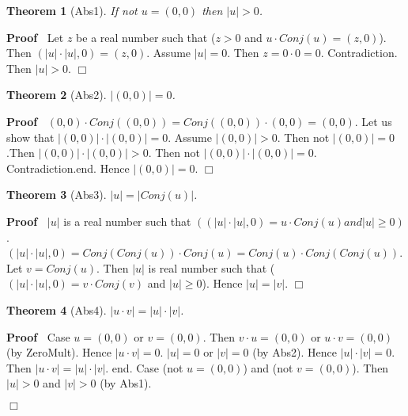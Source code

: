 \documentclass{article}
\newenvironment{forthel}{\begin{leftbar}}{\end{leftbar}}
\newenvironment{proof}{\noindent\textbf{Proof\ }}{\hspace*{\fill}$\Box$\medskip}
\newtheorem{theorem}{Theorem}
\newcommand{\cmul}{\cdot}
\begin{document}
\begin{forthel}
\begin{theorem}[Abs1] If not $u = (0,0)$ then $|u|  >  0$.
\end{theorem}\begin{proof}
  Let $z$ be a real number such that ($z  >  0$ and $u \cmul Conj(u) = (z,0)$). Then $(|u| \cdot |u|,0) = (z,0)$.\newline
Assume $|u| = 0$. Then $z = 0 \cdot 0 = 0$. Contradiction. \newline
Then $|u|  >  0$.
\end{proof}
\begin{theorem}[Abs2] $|(0,0)| = 0$.
\end{theorem}\begin{proof}
 	$(0,0)  \cmul  Conj((0,0)) = Conj((0,0))  \cmul  (0,0) = (0,0)$. \newline
Let us show that $|(0,0)| \cdot |(0,0)| = 0$.\newline
Assume $|(0,0)|  >  0$. Then not $|(0,0)| = 0$ .Then $|(0,0)| \cdot |(0,0)|  >  0$. Then not $|(0,0)| \cdot |(0,0)| = 0$. Contradiction.end. \newline
Hence $|(0,0)| = 0$.
\end{proof}
\begin{theorem}[Abs3] $|u| = |Conj(u)|$.
\end{theorem}\begin{proof}
 	$|u|$ is a real number such that $((|u| \cdot |u|,0) = u \cmul Conj(u) and |u|  \geq  0)$. \newline
$(|u| \cdot |u|,0) = Conj(Conj(u)) \cmul Conj(u) = Conj(u) \cmul Conj(Conj(u))$.\newline
Let $v = Conj(u)$. Then $|u|$ is real number such that ($(|u| \cdot |u|,0) = v \cmul Conj(v)$ and $|u|  \geq  0$). \newline
Hence $|u| = |v|$.
\end{proof}
\begin{theorem}[Abs4] $|u \cmul v| = |u|  \cdot  |v|$.
\end{theorem}\begin{proof}
 Case $u = (0,0)$ or $v = (0,0)$. Then $v \cmul u = (0,0)$ or $u \cmul v = (0,0)$ (by ZeroMult). \newline
Hence $|u \cmul v| = 0$. $|u| = 0$ or $|v| = 0$ (by Abs2).\newline
Hence $|u|  \cdot  |v| = 0$. Then  $|u \cmul v| = |u| \cdot |v|$. end.\newline
Case (not $u=(0,0)$) and (not $v = (0,0)$). Then $|u|  >  0$ and $|v|  >  0$ (by Abs1). \newline

\end{proof}
\end{forthel}
\end{document}
